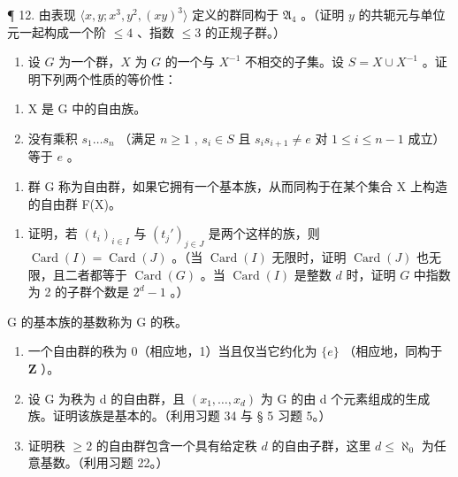 ¶ 12. 由表现 \(\langle x, y; x^3, y^2, (xy)^3 \rangle\) 定义的群同构于 \(\mathfrak{A}_4\) 。（证明 \(y\) 的共轭元与单位元一起构成一个阶 \(\leqslant 4\) 、指数 \(\leqslant 3\) 的正规子群。）

\begin{enumerate}
\def\labelenumi{\arabic{enumi}.}
\setcounter{enumi}{12}
\tightlist
\item
  设 \(G\) 为一个群，\(X\) 为 \(G\) 的一个与 \(X^{-1}\) 不相交的子集。设 \(S = X \cup X^{-1}\) 。证明下列两个性质的等价性：
\end{enumerate}

\begin{enumerate}
\def\labelenumi{(\roman{enumi})}
\item
  X 是 G 中的自由族。
\item
  没有乘积 \(s_1 \ldots s_n\) （满足 \(n \geqslant 1\) , \(s_i \in S\) 且 \(s_i s_{i+1} \neq e\) 对 \(1 \leqslant i \leqslant n-1\) 成立）等于 \(e\) 。
\end{enumerate}

\begin{enumerate}
\def\labelenumi{\arabic{enumi}.}
\setcounter{enumi}{13}
\tightlist
\item
  群 G 称为自由群，如果它拥有一个基本族，从而同构于在某个集合 X 上构造的自由群 F(X)。
\end{enumerate}

\begin{enumerate}
\def\labelenumi{(\alph{enumi})}
\tightlist
\item
  证明，若 \((t_i)_{i\in I}\) 与 \((t_j')_{j\in J}\) 是两个这样的族，则 \(\operatorname{Card}(I) = \operatorname{Card}(J)\) 。（当 \(\operatorname{Card}(I)\) 无限时，证明 \(\operatorname{Card}(J)\) 也无限，且二者都等于 \(\operatorname{Card}(G)\) 。当 \(\operatorname{Card}(I)\) 是整数 \(d\) 时，证明 \(G\) 中指数为 2 的子群个数是 \(2^d - 1\) 。）
\end{enumerate}

G 的基本族的基数称为 G 的秩。

\begin{enumerate}
\def\labelenumi{(\alph{enumi})}
\setcounter{enumi}{1}
\item
  一个自由群的秩为 0（相应地，1）当且仅当它约化为 \(\{e\}\) （相应地，同构于 \(\mathbf{Z}\) ）。
\item
  设 G 为秩为 d 的自由群，且 \((x_{1},\ldots,x_{d})\) 为 G 的由 d 个元素组成的生成族。证明该族是基本的。（利用习题 34 与 § 5 习题 5。）
\item
  证明秩 \(\geqslant 2\) 的自由群包含一个具有给定秩 \(d\) 的自由子群，这里 \(d \leqslant \aleph_0\) 为任意基数。（利用习题 22。）
\end{enumerate}

